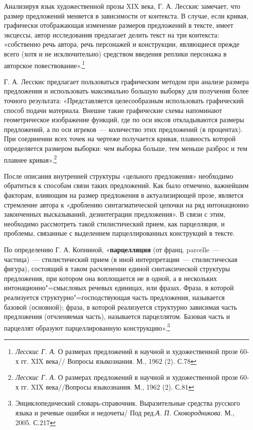 \documentclass{kursa4}
\begin{document}
      Анализируя язык художественной прозы XIX века, Г. А. Лесскис замечает, что размер предложений меняется в зависимости от контекста. В случае, если кривая, графически отображающая изменение размеров предложений в тексте, имеет эксцессы, автор исследования предлагает делить текст на три контекста: «собственно речь автора, речь персонажей и конструкции, являющиеся прежде всего (хотя и не исключительно) средством введения реплики персонажа в авторское повествование».\footnote{\textit{{ Лесскис Г. А. }}{О размерах предложений в научной и художественной прозе 60-х гг. XIX века// Вопросы языкознания. М., 1962 (2). С.78}}

      Г. А. Лесскис предлагает пользоваться графическим методом при анализе размера предложения и использовать максимально большую выборку для получения более точного результата: «Представляется целесообразным использовать графический способ подачи материала. Внешне такие графические схемы напоминают геометрическое изображение функций, где по оси иксов откладываются размеры предложений, а по оси игреков~--- количество этих предложений (в процентах). При соединении всех точек на чертеже получается кривая, плавность которой определяется размером выборки: чем выборка больше, тем меньше разброс и тем плавнее кривая».\footnote{\textit{{ Лесскис Г. А. }}{О размерах предложений в научной и художественной прозе 60-х гг. XIX века//Вопросы языкознания. М., 1962 (2). С.81}}

      После описания внутренней структуры «цельного предложения» необходимо обратиться к способам связи таких предложений. Как было отмечено, важнейшим факторам, влияющим на размер предложения в актуализирющей прозе, является стремление автора к «дроблению синтагматической цепочки на ряд интонационно законченных высказываний, дезинтеграции предложения». В связи с этим, необходимо рассмотреть такой стилистический прием, как парцелляция, и проблемы, связанные с выделением парцеллированных конструкций в тексте. 

      По определению Г. А. Копниной, «\textbf{парцелляция} (от франц. parcelle~--- частица)~--- стилистический прием (в иной интерпретации~--- стилистическая фигура), состоящий в таком расчленении единой синтаксической структуры предложения, при котором она воплощается не в одной, а в нескольких интонационно"=смысловых речевых единицах, или фразах. Фраза, в которой реализуется структурно"=господствующая часть предложения, называется базовой (основной); фраза, в которой реализуется структурно зависимая часть предложения (отчленяемая часть), называется парцеллятом. Базовая часть и парцеллят образуют парцеллированную конструкцию».\footnote{Энциклопедический словарь-справочник. Выразительные средства русского языка и речевые ошибки и недочеты/ Под ред.\textit{А. П. Сковородникова}{. М., 2005. С.217}}
\end{document}
